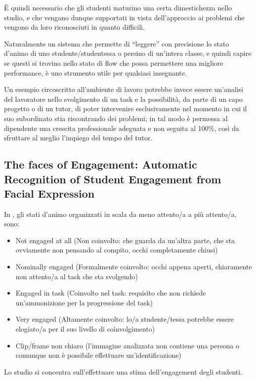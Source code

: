 È quindi necessario che gli studenti maturino una certa dimestichezza nello studio, e che vengano dunque supportati in vista dell’approccio ai problemi che vengono da loro riconosciuti in quanto difficili.

Naturalmente un sistema che permette di “leggere” con precisione lo stato d’animo di uno studente/studentessa o persino di un’intera classe, e quindi capire se questi si trovino nello stato di flow che possa permettere una migliore performance, è uno strumento utile per qualsiasi insegnante.

Un esempio circoscritto all’ambiente di lavoro potrebbe invece essere un’analisi del lavoratore nello svolgimento di un task e la possibilità, da parte di un capo progetto o di un tutor, di poter intervenire esclusivamente nel momento in cui il suo subordinato stia riscontrando dei problemi; in tal modo è permessa al dipendente una crescita professionale adeguata e non seguita al 100\%, così da sfruttare al meglio l’impiego del tempo del tutor.

\subsection {The faces of Engagement: Automatic Recognition of Student Engagement from Facial Expression}

In \cite{FacesOfEngagement}, gli stati d’animo organizzati in scala da meno attento/a a più attento/a, sono:
\begin{itemize}
    \item Not engaged at all (Non coinvolto: che guarda da un’altra parte, che sta ovviamente non pensando al compito, occhi completamente chiusi)
    \item Nominally engaged (Formalmente coinvolto: occhi appena aperti, chiaramente non attento/a al task che sta svolgendo)
    \item Engaged in task (Coinvolto nel task: requisito che non richiede un’ammonizione per la progressione del task)
    \item Very engaged (Altamente coinvolto: lo/a studente/tessa potrebbe essere elogiato/a per il suo livello di coinvolgimento)
    \item Clip/frame non chiaro (l’immagine analizzata non contiene una persona o comunque non è possibile effettuare un’identificazione)
\end{itemize}

Lo studio si concentra sull’effettuare una stima dell’engagement degli studenti. 

